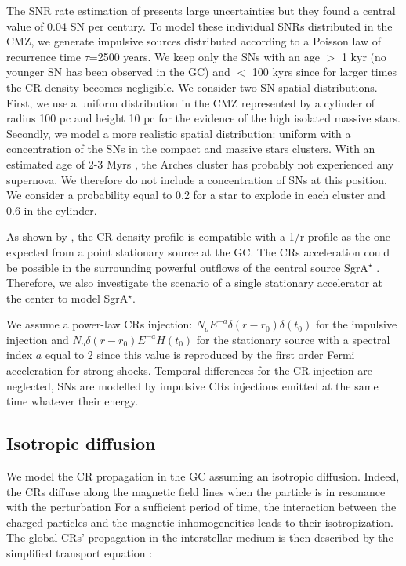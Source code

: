 \documentclass[a4paper,fleqn,usenatbib]{mnras}
\begin{document}
The SNR rate estimation of \citet{2011MNRAS.413..763C} presents large uncertainties but they found a central value of 0.04 SN per century. To model these individual SNRs distributed in the CMZ, we generate impulsive sources distributed according to a Poisson law of recurrence time $\tau$=2500 years. We keep only the SNs with an age $>$ 1 kyr (no younger SN has been observed in the GC) and $<$ 100 kyrs since for larger times the CR density becomes negligible. We consider two SN spatial distributions. First, we use a uniform distribution in the CMZ represented by a cylinder of radius 100 pc and height 10 pc for the evidence of the high isolated massive stars. Secondly, we model a more realistic spatial distribution: uniform with a concentration of the SNs in the compact and massive stars clusters. With an estimated age of 2-3 Myrs \citep{1999ApJ...525..750F}, the Arches cluster has probably not experienced any supernova. We therefore do not include a concentration of SNs at this position. We consider a probability equal to 0.2 for a star to explode in each cluster and 0.6 in the cylinder. 

As shown by \citet{2016Natur.531..476H}, the CR density profile is compatible with a 1/r profile as the one expected from a point stationary source at the GC. The CRs acceleration could be possible in the surrounding powerful outflows of the central source SgrA$^\star$ \citep{2006ApJ...647.1099L, 2013Sci...341..981W}. Therefore, we also investigate the scenario of a single stationary accelerator at the center to model SgrA$^\star$. 

We assume a power-law CRs injection: $N_o E^{-a}\delta(r-r_0)\delta(t_0)$ for the impulsive injection and $N_o \delta(r-r_0) E^{-a}H(t_0)$ for the stationary source with a spectral index $a$ equal to 2 since this value is reproduced by the first order Fermi acceleration for strong shocks. Temporal differences for the CR injection are neglected, SNs are modelled by impulsive CRs injections emitted at the same time whatever their energy.  

\subsection{Isotropic diffusion}
We model the CR propagation in the GC assuming an isotropic diffusion. Indeed, the CRs diffuse along the magnetic field lines when the particle is in resonance with the perturbation  For a sufficient period of time, the interaction between the charged particles and the magnetic inhomogeneities leads to their isotropization. The global CRs' propagation in the interstellar medium is then described by the simplified transport equation \citep{1990acr..book.....B}:
\end{document}
